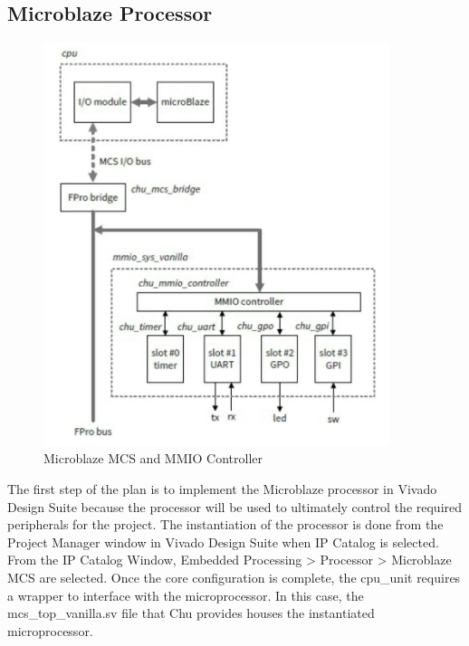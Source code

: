 \documentclass{article}
\begin{document}
\subsection{Microblaze Processor}
\begin{figure} 
\begin{center}
	\caption{Microblaze MCS and MMIO Controller}\label{fig:cpu}
	\includegraphics[width=0.9\textwidth]{cpu.jpg}
\end{center}
\end{figure}
The first step of the plan is to implement the Microblaze processor in Vivado Design Suite because the processor will be used to ultimately control the required peripherals for the project. The instantiation of the processor is done from the Project Manager window in Vivado Design Suite when IP Catalog is selected. From the IP Catalog Window, Embedded Processing > Processor > Microblaze MCS are selected. Once the core configuration is complete, the cpu\_unit requires a wrapper to interface with the microprocessor. In this case, the mcs\_top\_vanilla.sv file that Chu provides houses the instantiated microprocessor. 
\end{document}
